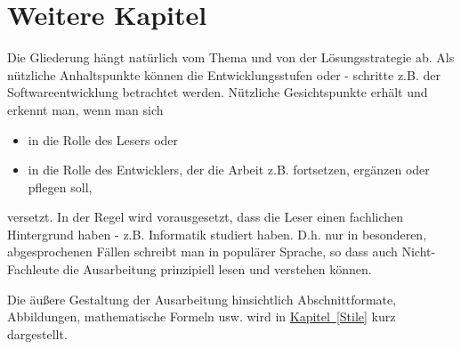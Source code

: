 \chapter{Weitere Kapitel}

Die Gliederung hängt natürlich vom Thema und von der Lösungsstrategie ab. Als nützliche
Anhaltspunkte können die Entwicklungsstufen oder - schritte z.B. der Softwareentwicklung betrachtet werden. Nützliche Gesichtspunkte erhält und erkennt man, wenn man sich
\begin{itemize}
  \item in die Rolle des Lesers oder
  \item in die Rolle des Entwicklers, der die Arbeit z.B. fortsetzen, ergänzen oder pflegen soll,
\end{itemize}
versetzt. In der Regel wird vorausgesetzt, dass die Leser einen fachlichen Hintergrund haben - z.B. Informatik studiert haben. D.h. nur in besonderen, abgesprochenen Fällen schreibt man in populärer Sprache, so dass auch Nicht-Fachleute die Ausarbeitung prinzipiell lesen und verstehen können.

Die äußere Gestaltung der Ausarbeitung hinsichtlich Abschnittformate, Abbildungen, mathematische Formeln usw. wird in \hyperref[Stile]{Kapitel~\ref*{Stile}} kurz dargestellt.